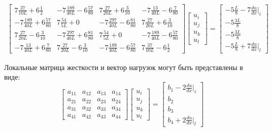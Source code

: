 \begin{align}\label{cub}
\begin{bmatrix}7\frac{37}{10L}  +6 \frac{1}{2} &   -7 \frac{189}{40L}  -6 \frac{57}{80} & 7\frac{27}{20L}  +6 \frac{3}{10} &   -7 \frac{13}{40L}   -6  \frac{7}{80}\\
	  -7 \frac{189}{40L}   +6 \frac{57}{80} & 7\frac{54}{5L}+0 &   -7 \frac{297}{40L}  -6 \frac{81}{80} & 7\frac{27}{20L}   +6 \frac{3}{10} \\
	7\frac{27}{20L}   -6  \frac{3}{10} &   -7 \frac{297}{40L}  +6 \frac{81}{80} & 7\frac{54}{5L}+0 &   -7 \frac{189}{40L}   -6 \frac{57}{80} \\
	  -7 \frac{13}{40L}   +6 \frac{7}{80} & 7\frac{27}{20L}  -6 \frac{3}{10} &   -7 \frac{189}{40L}  -6 \frac{57}{80} & 7\frac{37}{10L}   -6 \frac{1}{2}
\end{bmatrix}
\begin{bmatrix}
	u_i \\
	u_j \\
	u_k\\
	u_l
\end{bmatrix}
=
\begin{bmatrix}
    -5\frac{L}{8}   -7  \frac{du}{dx}|_i \\
	-5\frac{3L}{8}\\
	-5\frac{3L}{8}\\
	-5\frac{L}{8}   +7  \frac{du}{dx}|_l
\end{bmatrix}
\end{align}

Локальные матрица жесткости и вектор нагрузок могут быть представлены в виде:
$$ \begin{bmatrix}
a_{11}     &  a_{12}  &  a_{13} &  a_{14}\\
a_{21}     &  a_{22}  &  a_{23} &  a_{24}\\
a_{31}     &  a_{32}  &  a_{33} &  a_{34}\\
a_{41}     &  a_{42}  & a_{43}  &  a_{44}
\end{bmatrix}
\begin{bmatrix}
u_i \\
u_j \\
u_k\\
u_l
\end{bmatrix} =
\begin{bmatrix}
b_1 - 2 \frac{du}{dx}|_i \\
b_2\\
b_3\\
b_4 + 2 \frac{du}{dx}|_l
\end{bmatrix}$$

